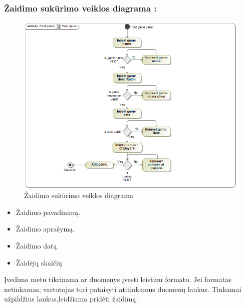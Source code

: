 \documentclass{VUMIFPSkursinis}
\begin{document}
		\subsubsection*{Žaidimo sukūrimo veiklos diagrama :}
			\begin{figure}[H]
				\centering
				\includegraphics[scale=0.5]{img/HostGame_activity}
				\caption{Žaidimo sukūrimo veiklos diagrama}
				\label{img:Hostgame_activity}
			\end{figure}
				\renewcommand{\labelitemi}{$\bullet$}
				\begin{itemize}
					\item Žaidimo pavadinimą.
					\item Žaidimo aprašymą.
					\item Žaidimo datą.
					\item Žaidėjų skaičių
				\end{itemize}
			Įvedimo metu tikrinama ar duomenys įvesti leistinu formatu. Jei formatas 
			netinkamas, vartotojas turi pataisyti atitinkamus duomenų laukus. Tinkamai
			užpildžius laukus,leidžiama pridėti žaidimą.
\end{document}

